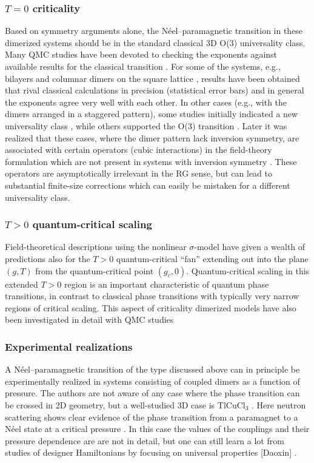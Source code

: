 \documentclass[range]{ar2e}
\begin{document}
\subsubsection{$T=0$ criticality}
Based on symmetry arguments alone, the N\'eel--paramagnetic transition in these dimerized systems
should be in the standard classical 3D O($3$) universality class. Many QMC studies 
have been devoted to checking the exponents against available results for the classical transition \cite{Sandvik94,Troyer96,Matsumoto01,Wang06,Wenzel08,Wenzel09}.
For some of the systems, e.g., bilayers \cite{Wang06} and columnar dimers on the square lattice \cite{Matsumoto01,Wenzel09,Sandvik10b}, results have been 
obtained that rival classical calculations in precision (statistical error bars) and in general the exponents agree very well with each other. In other 
cases (e.g., with the dimers arranged in a staggered pattern), some studies initially indicated a new universality class \cite{Wenzel08}, while others
supported the O($3$) transition \cite{Jiang12}.  Later it was realized that these cases, where the dimer pattern lack inversion symmetry, are associated 
with certain operators (cubic interactions) in the field-theory formulation  which are not present in systems with inversion symmetry \cite{Fritz11}. 
These operators are asymptotically irrelevant in the RG sense, but can lead to substantial finite-size corrections which can easily be mistaken for a 
different universality class.

\subsubsection{$T>0$ quantum-critical scaling}
Field-theoretical descriptions using the nonlinear $\sigma$-model \cite{Haldane83,Chakravarty89,Chubukov94} have given a wealth of 
predictions also for the $T>0$ quantum-critical ``fan'' extending out into the plane $(g,T)$  from the quantum-critical point $(g_c,0)$. Quantum-critical
scaling in this extended $T>0$ region is an important characteristic of quantum phase transitions, in contrast to classical phase transitions with typically 
very narrow regions of critical scaling. This aspect of criticality dimerized models have also been investigated in detail with QMC 
studies \cite{Sandvik95,Brenig06,Sandvik11a}

\subsubsection{Experimental realizations}
A N\'eel--paramagnetic transition of the type discussed above can in principle be experimentally realized in systems consisting of coupled dimers as a function 
of pressure. The authors are not aware of any case where the phase transition can be crossed in 2D geometry, but a well-studied 3D case is TlCuCl$_3$ 
\cite{Cavadini01,Ruegg04}. Here neutron scattering shows clear evidence of the phase transition from a paramagnet to a N\'eel state at a critical pressure 
\cite{Ruegg08}. In this case the values of the couplings and their pressure dependence are are not in detail, but one can still learn a lot from studies 
of designer Hamiltonians by focusing on universal properties [Daoxin] \cite{Troyer97,Yao07,Jin12,Oitmaa11}.
\end{document}

